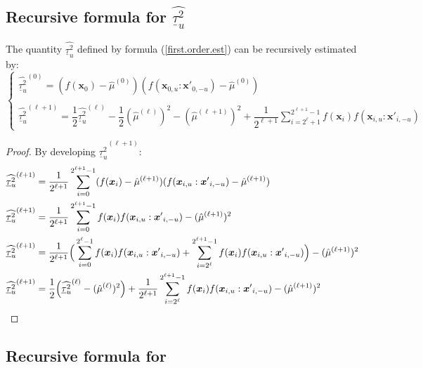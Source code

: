 \documentclass[]{elsarticle}
\makeatletter
\theoremstyle{definition}
\newcommand{\bvec}[1]{\boldsymbol{#1}}
\newcommand{\vx}{\bvec{x}}
\newcommand*{\ov}[1]{
  \m@th\overline{\mbox{#1}\raisebox{2mm}{}}
}
\makeatother
\begin{document}
\subsection{Recursive formula for $\widehat{\underline{\tau}_u^2}$}

The quantity $\widehat{\underline{\tau}_u^2}$ defined by formula (\ref{first.order.est}) can be recursively estimated by:
\begin{equation}
\left\lbrace \begin{array}{l}
\widehat{\underline{\tau}_u^2}^{(0)}= (f(\vx_0)-\hat{\mu}^{(0)})(f(\vx_{0,u}:{\vx'}_{0,-u})-\hat{\mu}^{(0)}) \\
\\
\widehat{\underline{\tau}_u^2}^{(\ell+1)} =  \dfrac{1}{2} \widehat{\underline{\tau}_u^2}^{(\ell)} - \dfrac{1}{2} (\hat{\mu}^{(\ell)})^2 - (\hat{\mu}^{(\ell+1)})^2 + \dfrac{1}{2^{\ell+1}} \sum \limits_{i=2^{\ell}+1}^{2^{\ell+1}-1} f(\vx_i) f(\vx_{i,u}:{\vx'}_{i,-u})
\end{array}\right.
\label{first.order.est.rec}
\end{equation}
\begin{proof}
By developing $\widehat{\underline{\tau}_u^2}^{(\ell+1)}$:
\begin{align*}
\widehat{\underline{\tau}_u^2}^{(\ell+1)} &= \frac{1}{2^{\ell+1}} \sum \limits_{i=0}^{2^{\ell+1}-1} (f(\vx_i)-\hat{\mu}^{(\ell+1)})(f(\vx_{i,u}:{\vx'}_{i,-u})-\hat{\mu}^{(\ell+1)}) \\
\widehat{\underline{\tau}_u^2}^{(\ell+1)} &= \frac{1}{2^{\ell+1}} \sum \limits_{i=0}^{2^{\ell+1}-1} f(\vx_i)f(\vx_{i,u}:{\vx'}_{i,-u})-(\hat{\mu}^{(\ell+1)})^2 \\
\widehat{\underline{\tau}_u^2}^{(\ell+1)} &= \frac{1}{2^{\ell+1}} \Big{(}\sum \limits_{i=0}^{2^{\ell}-1} f(\vx_i)f(\vx_{i,u}:{\vx'}_{i,-u}) + \sum \limits_{i=2^{\ell}}^{2^{\ell+1}-1} f(\vx_i)f(\vx_{i,u}:{\vx'}_{i,-u})\Big{)} -(\hat{\mu}^{(\ell+1)})^2 \\
\widehat{\underline{\tau}_u^2}^{(\ell+1)} &= \dfrac{1}{2}\Big{(}\widehat{\underline{\tau}_u^2}^{(\ell)}-(\hat{\mu}^{(\ell)})^2\Big{)} + \frac{1}{2^{\ell+1}} \sum \limits_{i=2^{\ell}}^{2^{\ell+1}-1} f(\vx_i)f(\vx_{i,u}:{\vx'}_{i,-u})-(\hat{\mu}^{(\ell+1)})^2 \\
\end{align*}
\end{proof}

\subsection{Recursive formula for} 
\end{document}
